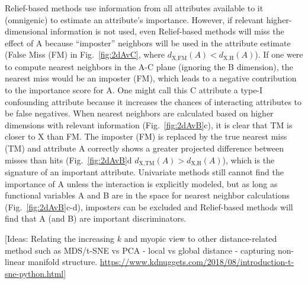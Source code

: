 \documentclass[10pt,letterpaper]{article}\usepackage[]{graphicx}\usepackage[]{color}
\begin{document}
Relief-based methods use information from all attributes available to it (omnigenic) to estimate an attribute's importance. However, if relevant higher-dimensional information is not used, even Relief-based methods will miss the effect of A because ``imposter'' neighbors will be used in the attribute estimate (False Miss (FM) in Fig.~\ref{fig:2dAvC}, where $d_{\text{X,FM}}(A)<d_{\text{X,H}}(A)$).  If one were to compute nearest neighbors in the A-C plane (ignoring the B dimension), the nearest miss would be an imposter (FM), which leads to a negative contribution to the importance score for A. One might call this C attribute a type-I confounding attribute because it increases the chances of interacting attributes to be false negatives. When nearest neighbors are calculated based on higher dimensions with relevant information (Fig.~\ref{fig:2dAvB}c), it is clear that TM is closer to X than FM. The imposter (FM) is replaced by the true nearest miss (TM) and attribute A correctly shows a greater projected difference between misses than hits (Fig.~\ref{fig:2dAvB}d $d_{\text{X,TM}}(A)>d_{\text{X,H}}(A)$), which is the signature of an important attribute. Univariate methods still cannot find the importance of A unless the interaction is explicitly modeled, but as long as functional variables A and B are in the space for nearest neighbor calculations (Fig.~\ref{fig:2dAvB}c-d), imposters can be excluded and Relief-based methods will find that A (and B) are important discriminators. 


[Ideas: Relating the increasing $k$ and myopic view to other distance-related method such as MDS/t-SNE vs PCA - local vs global distance - capturing non-linear manifold structure. \url{https://www.kdnuggets.com/2018/08/introduction-t-sne-python.html}]
\end{document}
